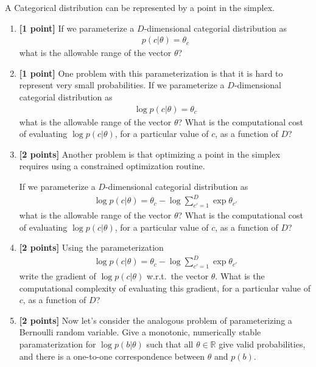 \documentclass{harvardml}
\theoremstyle{plain}
\begin{document}
\begin{problem}

A Categorical distribution can be represented by a point in the simplex.

\begin{enumerate}[label=(\alph*)]
\item {\bf [1 point]} If we parameterize a $D$-dimensional categorial distribution as
%
\begin{align}
p(c | \theta) = \theta_c
\end{align}
%
what is the allowable range of the vector $\theta$?

\item {\bf [1 point]} One problem with this parameterization is that it is hard to represent very small probabilities.
If we parameterize a $D$-dimensional categorial distribution as
%
\begin{align}
\log p(c | \theta) = \theta_c
\end{align}
%
what is the allowable range of the vector $\theta$?
What is the computational cost of evaluating $\log p(c | \theta)$, for a particular value of $c$, as a function of $D$?

\item {\bf [2 points]} Another problem is that optimizing a point in the simplex requires using a constrained optimization routine.

If we parameterize a $D$-dimensional categorial distribution as
%
\begin{align}
\log p(c | \theta) = \theta_c - \log \sum_{c' = 1}^D \exp \theta_{c'}
\end{align}
%
what is the allowable range of the vector $\theta$? 
What is the computational cost of evaluating $\log p(c | \theta)$, for a particular value of $c$, as a function of $D$?

\item {\bf [2 points]} Using the parameterization
%
\begin{align}
\log p(c | \theta) = \theta_c - \log \sum_{c' = 1}^D \exp \theta_{c'}
\end{align}
%
write the gradient of $\log p(c | \theta)$ w.r.t.\ the vector $\theta$.
What is the computational complexity of evaluating this gradient, for a particular value of $c$, as a function of $D$?

\item {\bf [2 points]} Now let's consider the analogous problem of parameterizing a Bernoulli random variable.
Give a monotonic, numerically stable paramaterization for $\log p(b | \theta)$ such that all $\theta \in \mathbb{R}$ give valid probabilities, and there is a one-to-one correspondence between $\theta$ and $p(b)$.
\end{enumerate}

\end{problem}
\end{document}
